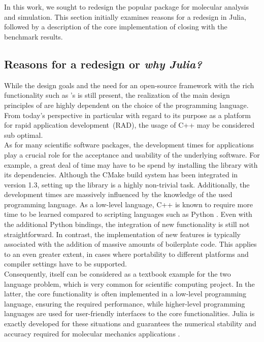 
\section{\biochem}
\label{sec:juliaball}
In this work, we sought to redesign the popular \ball package for molecular analysis and simulation. This section initially examines reasons for a redesign in Julia, followed by a description of the core implementation of \biochem closing with the benchmark results. 

\subsection{Reasons for a redesign or \textit{why Julia?}}

While the design goals and the need for an open-source framework with the rich functionality such as \ball's  is still present, the realization of the main design principles of \ball are highly dependent on the choice of the programming language. From today's perspective in particular with regard to its purpose as a platform for rapid application development~(RAD), the usage of C++ may be considered sub optimal. \\
As for many scientific software packages, the development times for applications play a crucial role for the acceptance and usability of the underlying software. For example, a great deal of time may have to be spend by installing the library with its dependencies. Although the CMake build system has been integrated in version 1.3, setting up the library is a highly non-trivial task. Additionally, the development times are massively influenced by the knowledge of the used programming language. As a low-level language, C++ is known to require more time to be learned compared to scripting languages such as Python \cite{Ousterhout1998}. 
Even with the additional Python bindings, the integration of new functionality is still not straightforward. In contrast, the implementation of new features is typically associated with the addition of massive amounts of boilerplate code. This applies to an even greater extent, in cases where portability to different platforms and compiler settings have to be supported. \\
Consequently, \ball itself can be considered as a textbook example for the two language problem, which is very common for scientific computing project. In the latter, the core functionality is often implemented in a low-level programming language, ensuring the required performance, while higher-level programming languages are used for user-friendly interfaces to the core functionalities. Julia is exactly developed for these situations and guarantees the numerical stability and accuracy required for molecular mechanics applications \cite{Julia_what, Julia_accomplish}.\\ 

